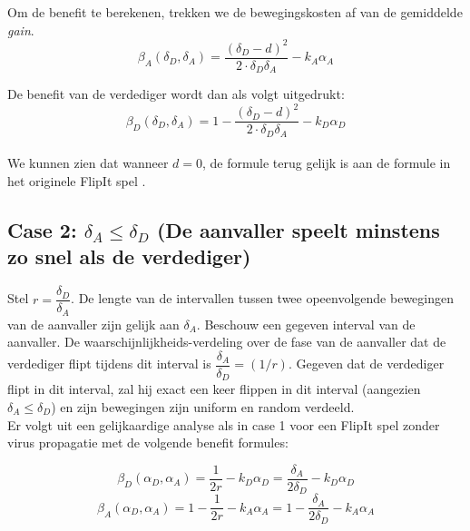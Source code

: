 \documentclass[master=cws, masteroption=vs,english]{kulemt}
\begin{document}
\begin{abstract*}
Om de benefit te berekenen, trekken we de bewegingskosten af van de gemiddelde \textit{gain}.
\begin{equation}\label{first}
\beta_{A}(\delta_{D},\delta_{A}) = \dfrac { (\delta_{D}-d) ^{2}} {2 \cdot \delta_{D}  \delta_{A}} - k_{A} \alpha_{A}
\end{equation}

 
De benefit van de verdediger wordt dan als volgt uitgedrukt:
 \begin{equation}\label{first}
\beta_{D}(\delta_{D},\delta_{A}) = 1 - \dfrac { (\delta_{D}-d) ^{2}} {2 \cdot \delta_{D}  \delta_{A}} - k_{D} \alpha_{D}
\end{equation}
~~\\
We kunnen zien dat wanneer $d=0$, de formule terug gelijk is aan de formule in het originele FlipIt spel \citep{FlipIt}. \\


\subsection*{\textbf{Case 2:} $\delta_{A} \leq \delta_{D} $ (De aanvaller speelt minstens zo snel als de verdediger)}

Stel $r = \dfrac{\delta_{D}}{ \delta_{A} }$. De lengte van de intervallen tussen twee opeenvolgende bewegingen van de aanvaller zijn gelijk aan $\delta_{A}$. Beschouw een gegeven interval van de aanvaller. De waarschijnlijkheids-verdeling over de fase van de aanvaller dat de verdediger flipt tijdens dit interval is $\dfrac{\delta_{A}}{ \delta_{D} } = (1/r)$. Gegeven dat de verdediger flipt in dit interval, zal hij exact een keer flippen in dit interval (aangezien $\delta_{A} \leq \delta_{D} $) en zijn bewegingen zijn uniform en random verdeeld. \\

Er volgt uit een gelijkaardige analyse als in case 1 voor een FlipIt spel zonder virus propagatie met de volgende benefit formules:

\begin{equation}\label{first}
\beta_{D}(\alpha_{D},\alpha_{A}) = \dfrac {1} {2r} - k_{D} \alpha_{D} = \dfrac {\delta_{A}} {2\delta_{D}} - k_{D} \alpha_{D} 
\end{equation}
\begin{equation}\label{first}
\beta_{A}(\alpha_{D},\alpha_{A}) =1 - \dfrac {1} {2r} - k_{A} \alpha_{A} = 1- \dfrac {\delta_{A}} {2\delta_{D}} - k_{A} \alpha_{A}  
\end{equation}\\


\end{abstract*}
\end{document}
